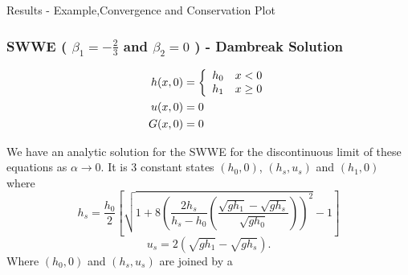 \documentclass[10pt]{elsarticle}
\begin{document}

Results - Example,Convergence and Conservation Plot

\subsubsection{SWWE ( $\beta_1= -\frac{2}{3}$ and $ \beta_2 =0$ ) - Dambreak Solution }
\begin{align}
h(x,0) & = \left\lbrace \begin{array}{c c}
h_0 & x < 0\\
h_1 & x \ge 0
\end{array} \right.  \\
u(x,0) &= 0 \\
G(x,0) &= 0
\end{align}


We have an analytic solution for the SWWE for the discontinuous limit of these equations as $\alpha \rightarrow 0$. It is 3 constant states $(h_0,0)$, $(h_s,u_s)$ and $(h_1,0)$ where
\begin{equation}
h_s = \dfrac{h_0}{2} \left[  \sqrt{1 + 8 \left( \dfrac{2 h_s}{h_s - h_0} \left(\dfrac{\sqrt{gh_1} - \sqrt{gh_s}}{\sqrt{gh_0}}\right)\right)^2 } - 1 \right]
\end{equation}
\begin{equation}
u_s = 2\left(\sqrt{gh_1} - \sqrt{gh_s} \right).
\end{equation}
Where $(h_0,0)$ and $(h_s,u_s)$ are joined by a 
\end{document}
